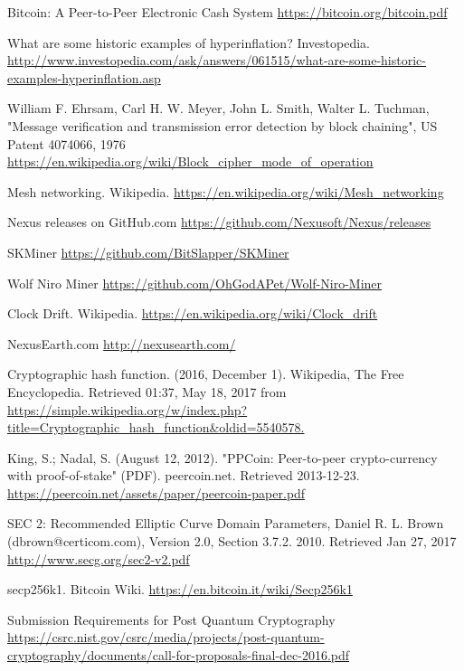 \documentclass[11pt]{article}
\begin{document}
\pagebreak
\begin{thebibliography}{7}

Bitcoin: A Peer-to-Peer Electronic Cash System \url{https://bitcoin.org/bitcoin.pdf}

What are some historic examples of hyperinflation? Investopedia.
\url{http://www.investopedia.com/ask/answers/061515/what-are-some-historic-examples-hyperinflation.asp}

William F. Ehrsam, Carl H. W. Meyer, John L. Smith, Walter L. Tuchman, "Message verification and transmission error detection by block chaining", US Patent 4074066, 1976 \url{https://en.wikipedia.org/wiki/Block_cipher_mode_of_operation}

Mesh networking. Wikipedia.
\url{https://en.wikipedia.org/wiki/Mesh_networking}

Nexus releases on GitHub.com
\url{https://github.com/Nexusoft/Nexus/releases}

SKMiner
\url{https://github.com/BitSlapper/SKMiner}

Wolf Niro Miner
\url{https://github.com/OhGodAPet/Wolf-Niro-Miner}

Clock Drift. Wikipedia.
\url{https://en.wikipedia.org/wiki/Clock_drift}

NexusEarth.com
\url{http://nexusearth.com/}

Cryptographic hash function. (2016, December 1). Wikipedia, The Free Encyclopedia. Retrieved 01:37, May 18, 2017 from \url{https://simple.wikipedia.org/w/index.php?title=Cryptographic_hash_function&oldid=5540578.}

King, S.; Nadal, S. (August 12, 2012). "PPCoin: Peer-to-peer crypto-currency with proof-of-stake" (PDF). peercoin.net. Retrieved 2013-12-23. \url{https://peercoin.net/assets/paper/peercoin-paper.pdf}

SEC 2: Recommended Elliptic Curve Domain Parameters, Daniel R. L. Brown (dbrown@certicom.com), Version 2.0, Section 3.7.2. 2010. Retrieved Jan 27, 2017 \url{http://www.secg.org/sec2-v2.pdf}

secp256k1. Bitcoin Wiki.
\url{https://en.bitcoin.it/wiki/Secp256k1}

Submission Requirements for Post Quantum Cryptography
\url{https://csrc.nist.gov/csrc/media/projects/post-quantum-cryptography/documents/call-for-proposals-final-dec-2016.pdf}
 

\end{thebibliography}
\end{document}

